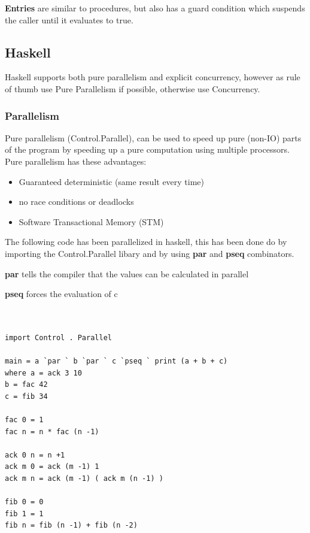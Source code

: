 \documentclass[a4paper,oneside]{report}
\begin{document}
      		\noindent\textbf{Entries} are similar to procedures, but also has a guard condition which suspends the caller until it evaluates to true. 
      		
    	\subsection{Haskell}

		Haskell supports both pure parallelism and explicit concurrency, however as rule of thumb use Pure Parallelism if possible, otherwise use Concurrency.

		\subsubsection{Parallelism}

			Pure parallelism (Control.Parallel), can be used to speed up pure (non-IO) parts of the program by speeding up a pure computation using multiple processors. Pure parallelism has these advantages:
				\begin{itemize}
					\item Guaranteed deterministic (same result every time)
					\item no race conditions or deadlocks
					\item Software Transactional Memory (STM)
				\end{itemize}


The following code has been parallelized in haskell, this has been done do by importing the Control.Parallel libary and by using \textbf{par} and \textbf{pseq} combinators. 

\textbf{par} tells the compiler that the values can be calculated in parallel

\textbf{pseq} forces the evaluation of c 


\begin{lstlisting}[label=some-code,caption=Parallel code in haskell] 


import Control . Parallel

main = a `par ` b `par ` c `pseq ` print (a + b + c)
where a = ack 3 10
b = fac 42
c = fib 34

fac 0 = 1
fac n = n * fac (n -1)

ack 0 n = n +1
ack m 0 = ack (m -1) 1
ack m n = ack (m -1) ( ack m (n -1) )

fib 0 = 0
fib 1 = 1
fib n = fib (n -1) + fib (n -2)



\end{lstlisting}
\end{document}

